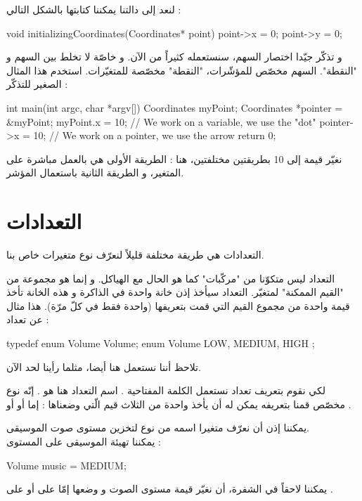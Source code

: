 لنعد إلى دالتنا
يمكننا كتابتها بالشكل التالي :

\begin{Csource}
void initializingCoordinates(Coordinates* point)
{
	point->x = 0;
	point->y = 0;
}
\end{Csource}

و تذكّر جيّدا اختصار السهم، سنستعمله كثيراً من الآن. و خاصّة لا تخلط بين السهم و "النقطة". السهم مخصّص للمؤشّرات، "النقطة" مخصّصة للمتغيّرات. استخدم هذا المثال الصغير للتذكّر :

\begin{Csource}
int main(int argc, char *argv[])
{
	Coordinates  myPoint;
	Coordinates *pointer = &myPoint;
	myPoint.x = 10; // We work on a variable, we use the "dot"
	pointer->x = 10; // We work on a pointer, we use the arrow
	return 0;
}
\end{Csource}

نغيّر قيمة
إلى 10 بطريقتين مختلفتين، هنا : الطريقة الأولى هي بالعمل مباشرة على المتغير، و الطريقة الثانية باستعمال المؤشر.

\section{التعدادات}

التعدادات هي طريقة مختلفة قليلاً لنعرّف نوع متغيرات خاص بنا.

التعداد ليس متكوّنا من "مركّبات"  كما هو الحال مع الهياكل. و إنما هو مجموعة من "القيم الممكنة" لمتغيّر. التعداد سيأخذ إذن خانة واحدة في الذاكرة و هذه الخانة تأخذ قيمة واحدة من مجموع القيم التي قمت بتعريفها (واحدة فقط في كلّ مرّة).
هذا مثال عن تعداد :
\begin{Csource}
typedef enum Volume Volume;
enum Volume
{
	LOW, MEDIUM, HIGH
};
\end{Csource}
تلاحظ أننا نستعمل
هنا أيضا، مثلما رأينا لحد الآن.

لكي نقوم بتعريف تعداد نستعمل الكلمة المفتاحية
.
اسم التعداد هنا هو
.
إنّه نوع مخصّص قمنا بتعريفه يمكن له أن يأخذ واحدة من الثلاث قيم الّتي وضعناها : إما
أو
أو
.

يمكننا إذن أن نعرّف متغيرا اسمه
من نوع
لتخزين مستوى صوت الموسيقى.\\
يمكننا تهيئة الموسيقى على المستوى
 :
\begin{Csource}
Volume music = MEDIUM;
\end{Csource}
يمكننا لاحقاً في الشفرة، أن نغيّر قيمة مستوى الصوت و وضعها إمّا على
أو على
.

